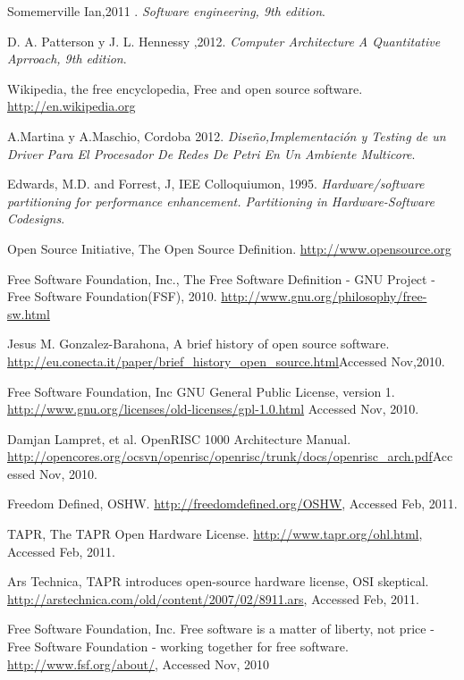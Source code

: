 \documentclass[a4paper,12pt]{report}
\begin{document}
\begin{thebibliography}{99}

 Somemerville Ian,2011 .
  \textit{Software engineering, 9th edition}.

 D. A. Patterson y J. L. Hennessy ,2012.
  \textit{Computer Architecture A Quantitative Aprroach, 9th edition}.

Wikipedia, the free encyclopedia, Free and open source software.
\url{http://en.wikipedia.org}

A.Martina y A.Maschio, Cordoba 2012.
  \textit{Diseño,Implementación y Testing de un Driver Para El Procesador De Redes De Petri En Un Ambiente Multicore}.

 Edwards, M.D. and Forrest, J, IEE Colloquiumon, 1995.
  \textit{ Hardware/software partitioning for performance enhancement. Partitioning in Hardware-Software Codesigns}.

 Open Source Initiative, The Open Source Definition.
 \url{http://www.opensource.org}

 Free Software Foundation, Inc., The Free Software Definition - GNU Project - Free Software Foundation(FSF), 2010.
 \url{http://www.gnu.org/philosophy/free-sw.html}

Jesus M. Gonzalez-Barahona, A brief history of open source software.
\url{http://eu.conecta.it/paper/brief_history_open_source.html}Accessed Nov,2010.

Free Software Foundation, Inc GNU General Public License, version 1.
\url{http://www.gnu.org/licenses/old-licenses/gpl-1.0.html} Accessed Nov, 2010.

 Damjan Lampret, et al. OpenRISC 1000 Architecture Manual.
\url{http://opencores.org/ocsvn/openrisc/openrisc/trunk/docs/openrisc_arch.pdf}Accessed Nov, 2010.

Freedom Defined, OSHW.
\url{ http://freedomdefined.org/OSHW}, Accessed Feb, 2011.

TAPR, The TAPR Open Hardware License. \url{http://www.tapr.org/ohl.html}, Accessed Feb, 2011.

Ars Technica, TAPR introduces open-source hardware license, OSI skeptical.
\url{http://arstechnica.com/old/content/2007/02/8911.ars}, Accessed Feb, 2011.

Free Software Foundation, Inc. Free software is a matter of liberty, not price - Free Software Foundation - working together for free software.
\url{http://www.fsf.org/about/}, Accessed Nov, 2010


\end{thebibliography}
\end{document}
